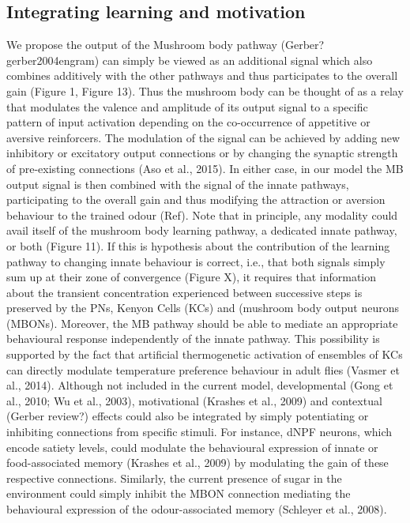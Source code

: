 \documentclass[10pt,a4paper]{article}
\begin{document}
\subsection{Integrating learning and motivation}
We propose the output of the Mushroom body pathway (Gerber?gerber2004engram) can simply be viewed as an additional signal which also combines additively with the other pathways and thus participates to the overall gain (Figure 1, Figure 13). Thus the mushroom body can be thought of as a relay that modulates the valence and amplitude of its output signal to a specific pattern of input activation depending on the co-occurrence of appetitive or aversive reinforcers. The modulation of the signal can be achieved by adding new inhibitory or excitatory output connections or by changing the synaptic strength of pre-existing connections (Aso et al., 2015). In either case, in our model the MB output signal is then combined with the signal of the innate pathways, participating to the overall gain and thus modifying the attraction or aversion behaviour to the trained odour (Ref). Note that in principle, any modality could avail itself of the mushroom body learning pathway, a dedicated innate pathway, or both (Figure 11). 
If this is hypothesis about the contribution of the learning pathway to changing innate behaviour is correct, i.e., that both signals simply sum up at their zone of convergence (Figure X), it requires that information about the transient concentration experienced between successive steps is preserved by the PNs, Kenyon Cells (KCs) and (mushroom body output neurons (MBONs). Moreover, the MB pathway should be able to mediate an appropriate behavioural response independently of the innate pathway. This possibility is supported by the fact that artificial thermogenetic activation of ensembles of KCs can directly modulate temperature preference behaviour in adult flies (Vasmer et al., 2014). 
Although not included in the current model, developmental (Gong et al., 2010; Wu et al., 2003), motivational (Krashes et al., 2009) and contextual (Gerber review?) effects could also be integrated by simply potentiating or inhibiting connections from specific stimuli. For instance, dNPF neurons, which encode satiety levels, could modulate the behavioural expression of innate or food-associated memory (Krashes et al., 2009) by modulating the gain of these respective connections. Similarly, the current presence of sugar in the environment could simply inhibit the MBON connection mediating the behavioural expression of the odour-associated memory (Schleyer et al., 2008).
\end{document}
